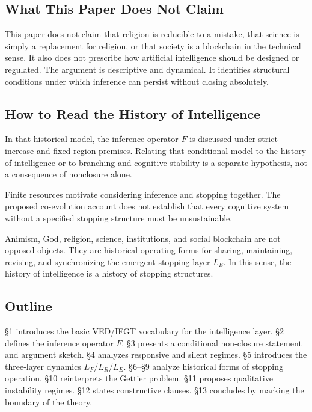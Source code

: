\subsection{What This Paper Does Not Claim}

This paper does not claim that religion is reducible to a mistake, that science is simply a replacement for religion, or that society is a blockchain in the technical sense. It also does not prescribe how artificial intelligence should be designed or regulated. The argument is descriptive and dynamical. It identifies structural conditions under which inference can persist without closing absolutely.

\subsection{How to Read the History of Intelligence}

In that historical model, the inference operator $F$ is discussed under strict-increase and fixed-region premises. Relating that conditional model to the history of intelligence or to branching and cognitive stability is a separate hypothesis, not a consequence of nonclosure alone.

Finite resources motivate considering inference and stopping together. The proposed co-evolution account does not establish that every cognitive system without a specified stopping structure must be unsustainable.

Animism, God, religion, science, institutions, and social blockchain are not opposed objects. They are historical operating forms for sharing, maintaining, revising, and synchronizing the emergent stopping layer $L_E$. In this sense, the history of intelligence is a history of stopping structures.

\subsection{Outline}

\S{}1 introduces the basic VED/IFGT vocabulary for the intelligence layer. \S{}2 defines the inference operator $F$. \S{}3 presents a conditional non-closure statement and argument sketch. \S{}4 analyzes responsive and silent regimes. \S{}5 introduces the three-layer dynamics $L_F/L_R/L_E$. \S{}6--\S{}9 analyze historical forms of stopping operation. \S{}10 reinterprets the Gettier problem. \S{}11 proposes qualitative instability regimes. \S{}12 states constructive clauses. \S{}13 concludes by marking the boundary of the theory.

\bigskip
